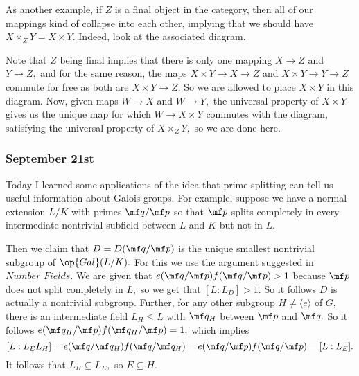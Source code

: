 As another example, if $Z$ is a final object in the category, then all of our mappings kind of collapse into each other, implying that we should have $X\times_ZY=X\times Y.$ Indeed, look at the associated diagram.
\begin{center}
\end{center}
Note that $Z$ being final implies that there is only one mapping $X\to Z$ and $Y\to Z,$ and for the same reason, the maps $X\times Y\to X\to Z$ and $X\times Y\to Y\to Z$ commute for free as both are $X\times Y\to Z.$ So we are allowed to place $X\times Y$ in this diagram. Now, given maps $W\to X$ and $W\to Y,$ the universal property of $X\times Y$ gives us the unique map for which $W\to X\times Y$ commutes with the diagram, satisfying the universal property of $X\times_ZY,$ so we are done here.

\subsubsection{September 21st}
Today I learned some applications of the idea that prime-splitting can tell us useful information about Galois groups. For example, suppose we have a normal extension $L/K$ with primes $\mf q/\mf p$ so that $\mf p$ splits completely in every intermediate nontrivial subfield between $L$ and $K$ but not in $L.$

Then we claim that $D=D(\mf q/\mf p)$ is the unique smallest nontrivial subgroup of $\op{Gal}(L/K).$ For this we use the argument suggested in $\textit{Number Fields}.$ We are given that $e(\mf q/\mf p)f(\mf q/\mf p)>1$ because $\mf p$ does not split completely in $L,$ so we get that $[L:L_D]>1.$ So it follows $D$ is actually a nontrivial subgroup. Further, for any other subgroup $H\ne\langle e\rangle$ of $G,$ there is an intermediate field $L_H\le L$ with $\mf q_H$ between $\mf p$ and $\mf q.$ So it follows $e(\mf q_H/\mf p)f(\mf q_H/\mf p)=1,$ which implies
\[[L:L_EL_H]=e(\mf q/\mf q_H)f(\mf q/\mf q_H)=e(\mf q/\mf p)f(\mf q/\mf p)=[L:L_E].\]
It follows that $L_H\subseteq L_E,$ so $E\subseteq H.$

